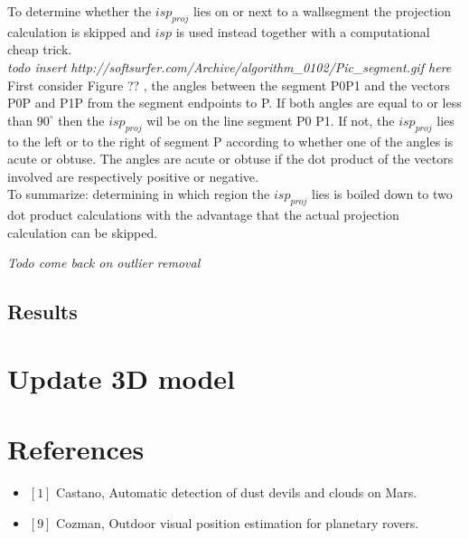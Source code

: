 \documentclass[10pt]{article}
\begin{document}
To determine whether the $isp_{proj}$ lies on or next to a wallsegment the
projection calculation is skipped and $isp$ is used instead together with a
computational cheap trick.\\


\textit{ todo insert http://softsurfer.com/Archive/algorithm\_0102/Pic\_segment.gif here}\\
First consider Figure ?? , the angles between the segment P0P1 and the vectors P0P and P1P
from the segment endpoints to P. If both angles are equal to or less than
$90^{\circ}$ then the $isp_{proj}$ wil be on the line segment P0 P1.  If not,
the $isp_{proj}$ lies to the left or to the right of segment P according to
whether one of the angles is acute or obtuse.  The angles are acute or obtuse
if the dot product of the vectors involved are respectively positive or
	negative.\\
To summarize: determining in which region the $isp_{proj}$ lies is boiled down to
two dot product calculations with the advantage that the actual projection
calculation can be skipped.


\textit{Todo come back on outlier removal}
\subsection{Results}

\section{Update 3D model}


\section{References}
\begin{itemize}
\item $[1]$ Castano, Automatic detection of dust devils and clouds on Mars.
\item $[9]$ Cozman, Outdoor visual position estimation for planetary rovers.
\end{itemize}
\end{document}
